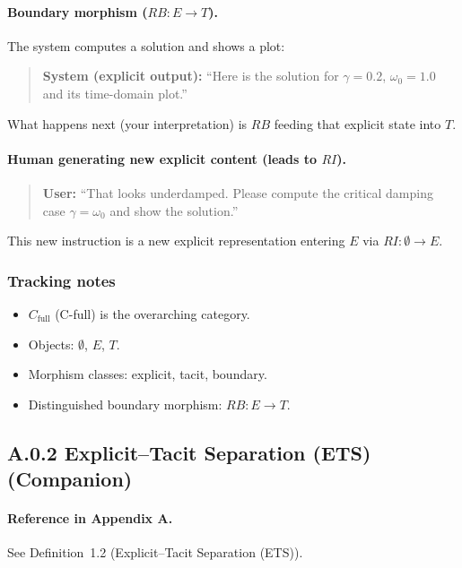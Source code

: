 \paragraph{Boundary morphism ($RB : E \to T$).}
The system computes a solution and shows a plot:

\begin{quote}
\textbf{System (explicit output):} 
``Here is the solution for $\gamma = 0.2$, $\omega_0 = 1.0$ and its time-domain plot.'' 
\end{quote}

What happens next (your interpretation) is $RB$ feeding that explicit state into $T$.

\paragraph{Human generating new explicit content (leads to $RI$).}
\begin{quote}
\textbf{User:} 
``That looks underdamped. Please compute the critical damping case $\gamma = \omega_0$ and show the solution.'' 
\end{quote}

This new instruction is a new explicit representation entering $E$ via $RI : \emptyset \to E$.

\subsubsection*{Tracking notes}

\begin{itemize}
 \item $C_{\text{full}}$ (C-full) is the overarching category.
 \item Objects: $\emptyset$, $E$, $T$.
 \item Morphism classes: explicit, tacit, boundary.
 \item Distinguished boundary morphism: $RB : E \to T$.
\end{itemize}

\newpage

\subsection{A.0.2 Explicit--Tacit Separation (ETS) (Companion)}

\paragraph{Reference in Appendix A.}
See Definition~1.2 (Explicit--Tacit Separation (ETS)).

